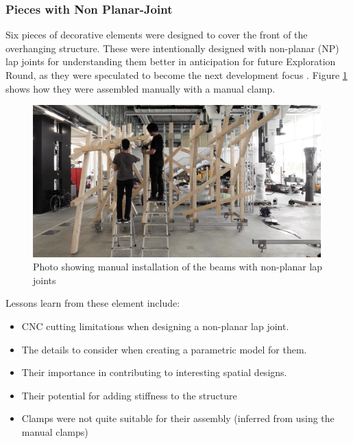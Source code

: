 \subsubsection{Pieces with Non Planar-Joint}
\label{subsubsection:exploration-2-pieces-with-non-planar-joint}

Six pieces of decorative elements were designed to cover the front of the overhanging structure. These were intentionally designed with non-planar (NP) lap joints for understanding them better in anticipation for future Exploration Round, as they were speculated to become the next development focus . Figure \ref{fig:manual-non-planar-install} shows how they were assembled manually with a manual clamp. 

\begin{figure}[!h]
    \centering
    \includegraphics[width=0.99\textwidth]{images/05/image97.jpg}
    \caption{Photo showing manual installation of the beams with non-planar lap joints}
    \label{fig:manual-non-planar-install}
\end{figure}

\FloatBarrier

Lessons learn from these element include:

\begin{itemize}[nosep]
    \item CNC cutting limitations when designing a non-planar lap joint. 
    \item The details to consider when creating a parametric model for them. 
    \item Their importance in contributing to interesting spatial designs. 
    \item Their potential for adding stiffness to the structure
    \item Clamps were not quite suitable for their assembly (inferred from using the manual clamps)
\end{itemize}

